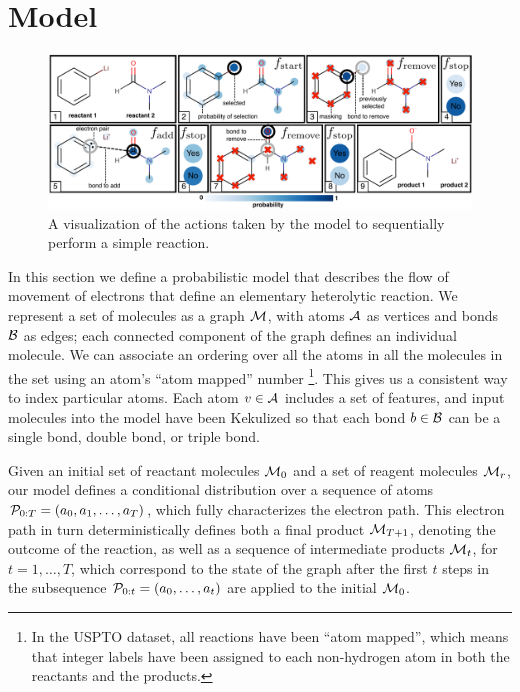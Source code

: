 
\section{Model}



\begin{figure}
\centering
\includegraphics[width=\textwidth]{reaction_model_blue}
\caption{A visualization of the actions taken by the model to sequentially perform a simple reaction.}
\label{fig:reaction_model}
\end{figure}



In this section we define a probabilistic model that describes the flow of movement of electrons that define an elementary heterolytic reaction.
We represent a set of molecules as a graph ${\mathcal{M}}$, with atoms ${\mathcal{A}}$ as vertices and bonds ${\mathcal{B}}$ as edges;
each connected component of the graph defines an individual molecule.
We can associate an ordering over all the atoms in all the molecules in the set using an atom's ``atom mapped'' number \footnote{In the USPTO dataset, all reactions have been ``atom mapped'', which means that integer labels have been assigned to each non-hydrogen atom in both the reactants and the products.}. This gives us a consistent way to index particular atoms.
Each atom $v \in {\mathcal{A}}$ includes a set of features,
and input molecules into the model have been Kekulized  so that each bond $b \in {\mathcal{B}}$ can be a single bond, double bond, or triple bond.





Given an initial set of reactant molecules ${\mathcal{M}}_0$ and a set of reagent molecules ${\mathcal{M}}_r$, 
our model defines a conditional distribution over a sequence of atoms ${\mathcal{P}}_{0:T} = (a_0, a_1, \ldots, a_T)$,
which fully characterizes the electron path.
This electron path in turn deterministically defines both a final product ${\mathcal{M}}_{T+1}$, 
denoting the outcome of the reaction,
as well as a sequence of intermediate products ${\mathcal{M}}_t$, for $t = 1,\dots,T$,
which correspond to the state of the graph after the first $t$ steps in the subsequence ${\mathcal{P}}_{0:t} = (a_0, \dots, a_t)$ are applied to the initial ${\mathcal{M}}_0$.


